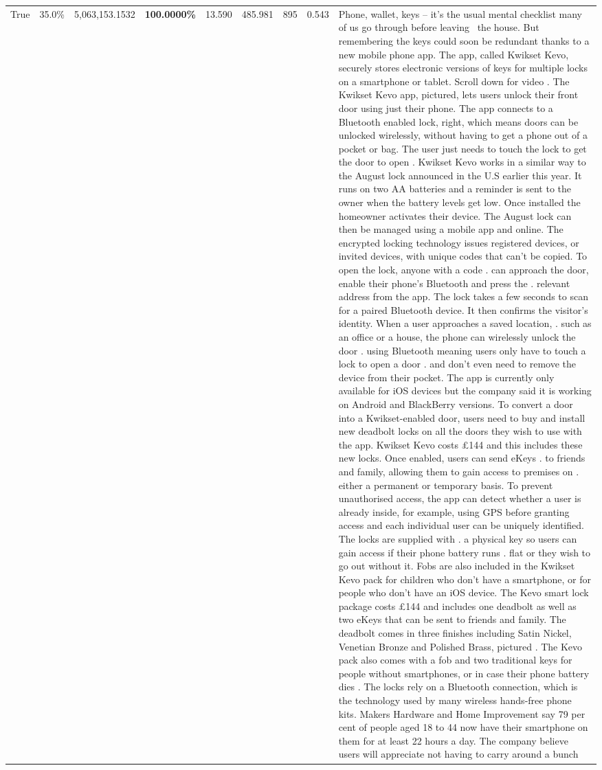 \begin{table}[H]
\begin{tabular}{lllrlllll}
True & 35.0\% & 5,063,153.1532 & \bfseries \color{red} 100.0000\% & 13.590 & 485.981 & 895 & 0.543 & Phone, wallet, keys – it’s the usual mental checklist many of us go through before leaving  the house. But remembering the keys could soon be redundant thanks to a new mobile phone app. The app, called Kwikset Kevo, securely stores electronic versions of keys for multiple locks on a smartphone or tablet. Scroll down for video . The Kwikset Kevo app, pictured, lets users unlock their front door using just their phone. The app connects to a Bluetooth enabled lock, right, which means doors can be unlocked wirelessly, without having to get a phone out of a pocket or bag. The user just needs to touch the lock to get the door to open . Kwikset Kevo works in a similar way to the August lock announced in the U.S earlier this year. It runs on two AA batteries and a reminder is sent to the owner when the battery levels get low. Once installed the homeowner activates their device. The August lock can then be managed using a mobile app and online. The encrypted locking technology issues registered devices, or invited devices, with unique codes that can't be copied. To open the lock, anyone with a code . can approach the door, enable their phone's Bluetooth and press the . relevant address from the app. The lock takes a few seconds to scan for a paired Bluetooth device. It then confirms the visitor's identity. When a user approaches a saved location, . such as an office or a house, the phone can wirelessly unlock the door . using Bluetooth meaning users only have to touch a lock to open a door . and don't even need to remove the device from their pocket. The app is currently only available for iOS devices but the company said it is working on Android and BlackBerry versions. To convert a door into a Kwikset-enabled door, users need to buy and install new deadbolt locks on all the doors they wish to use with the app. Kwikset Kevo costs £144 and this includes these new locks. Once enabled, users can send eKeys . to friends and family, allowing them to gain access to premises on . either a permanent or temporary basis. To prevent unauthorised access, the app can detect whether a user is already inside, for example, using GPS before granting access and each individual user can be uniquely identified. The locks are supplied with . a physical key so users can gain access if their phone battery runs . flat or they wish to go out without it. Fobs are also included in the Kwikset Kevo pack for children who don't have a smartphone, or for people who don't have an iOS device. The Kevo smart lock package costs £144 and includes one deadbolt as well as two eKeys that can be sent to friends and family. The deadbolt comes in three finishes including Satin Nickel, Venetian Bronze and Polished Brass, pictured . The Kevo pack also comes with a fob and two traditional keys for people without smartphones, or in case their phone battery dies . The locks rely on a Bluetooth connection, which is the technology used by many wireless hands-free phone kits. Makers Hardware and Home Improvement say 79 per cent of people aged 18 to 44 now have their smartphone on them for at least 22 hours a day. The company believe users will appreciate not having to carry around a bunch 
\end{tabular}
\end{table}
